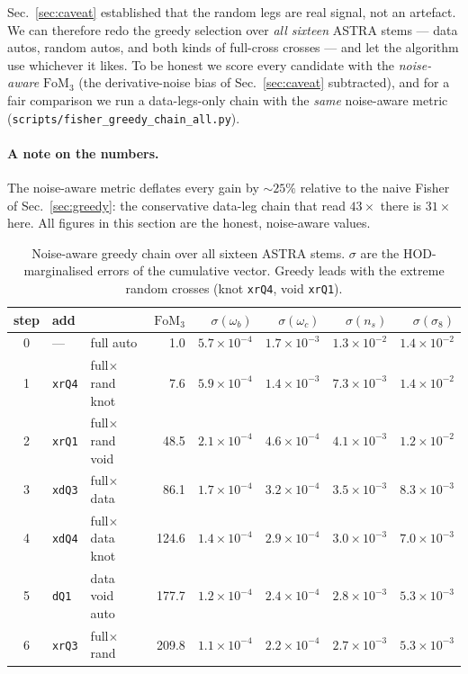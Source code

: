 \documentclass[11pt]{article}
\newcommand{\FoM}{\mathrm{FoM}}
\newcommand{\code}[1]{\texttt{#1}}
\begin{document}
Sec.~\ref{sec:caveat} established that the random legs are real signal, not an
artefact.  We can therefore redo the greedy selection over \emph{all sixteen}
ASTRA stems --- data autos, random autos, and both kinds of full-cross crosses ---
and let the algorithm use whichever it likes.  To be honest we score every
candidate with the \emph{noise-aware} $\FoM_3$ (the derivative-noise bias of
Sec.~\ref{sec:caveat} subtracted), and for a fair comparison we run a
data-legs-only chain with the \emph{same} noise-aware metric
(\code{scripts/fisher\_greedy\_chain\_all.py}).

\paragraph{A note on the numbers.}  The noise-aware metric deflates every gain by
$\sim\!25\%$ relative to the naive Fisher of Sec.~\ref{sec:greedy}: the
conservative data-leg chain that read $43\times$ there is $31\times$ here.  All
figures in this section are the honest, noise-aware values.

\begin{table}[t]
\centering
\caption{Noise-aware greedy chain over all sixteen ASTRA stems.  $\sigma$ are the
HOD-marginalised errors of the cumulative vector.  Greedy leads with the extreme
random crosses (knot \code{xrQ4}, void \code{xrQ1}).}
\label{tab:allstems}
\begin{tabular}{cllrrrrr}
\toprule
step & add & & $\FoM_3$ & $\sigma(\omega_b)$ & $\sigma(\omega_c)$ & $\sigma(n_s)$ & $\sigma(\sigma_8)$ \\
\midrule
0 & ---         & full auto    &   1.0 & $5.7\times10^{-4}$ & $1.7\times10^{-3}$ & $1.3\times10^{-2}$ & $1.4\times10^{-2}$ \\
1 & \code{xrQ4} & full$\times$rand knot &   7.6 & $5.9\times10^{-4}$ & $1.4\times10^{-3}$ & $7.3\times10^{-3}$ & $1.4\times10^{-2}$ \\
2 & \code{xrQ1} & full$\times$rand void &  48.5 & $2.1\times10^{-4}$ & $4.6\times10^{-4}$ & $4.1\times10^{-3}$ & $1.2\times10^{-2}$ \\
3 & \code{xdQ3} & full$\times$data       &  86.1 & $1.7\times10^{-4}$ & $3.2\times10^{-4}$ & $3.5\times10^{-3}$ & $8.3\times10^{-3}$ \\
4 & \code{xdQ4} & full$\times$data knot  & 124.6 & $1.4\times10^{-4}$ & $2.9\times10^{-4}$ & $3.0\times10^{-3}$ & $7.0\times10^{-3}$ \\
5 & \code{dQ1}  & data void auto         & 177.7 & $1.2\times10^{-4}$ & $2.4\times10^{-4}$ & $2.8\times10^{-3}$ & $5.3\times10^{-3}$ \\
6 & \code{xrQ3} & full$\times$rand       & 209.8 & $1.1\times10^{-4}$ & $2.2\times10^{-4}$ & $2.7\times10^{-3}$ & $5.3\times10^{-3}$ \\
\bottomrule
\end{tabular}
\end{table}
\end{document}
